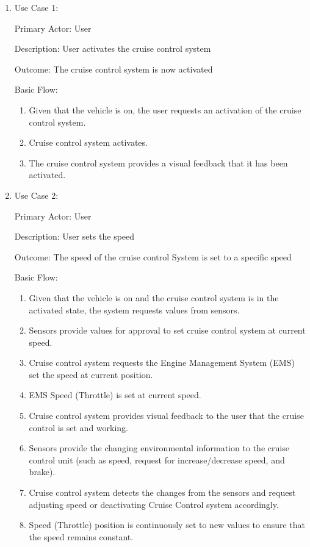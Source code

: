 \documentclass[preprint,11pt,3p]{article}
\begin{document}
\begin{enumerate}
	\item 	Use Case 1:\par
			Primary Actor: User\par
			Description: User activates the cruise control system\par
			Outcome: The cruise control system is now activated\par
			Basic Flow:
		\begin{enumerate}
			\item Given that the vehicle is on, the user requests an activation of the cruise control system.
			\item Cruise control system activates.
			\item The cruise control system provides a visual feedback that it has been activated.
		\end{enumerate}
	\item 	Use Case 2: \par
			Primary Actor: User \par
			Description: User sets the speed\par
			Outcome: The speed of the cruise control System is set to a specific speed\par
			Basic Flow:
		\begin{enumerate}
			\item Given that the vehicle is on and the cruise control system is in the activated state, the system requests values from sensors.
			\item Sensors provide values for approval to set cruise control system at current speed.
			\item Cruise control system requests the Engine Management System (EMS) set the speed at current position.
			\item EMS Speed (Throttle) is set at current speed.
			\item Cruise control system provides visual feedback to the user that the cruise control is set and working.
			\item Sensors provide the changing environmental information to the cruise control unit (such as speed, request for increase/decrease speed, and brake).
			\item Cruise control system detects the changes from the sensors and request adjusting speed or deactivating Cruise Control system accordingly.
			\item Speed (Throttle) position is continuously set to new values to ensure that the speed remains constant.

\end{enumerate}
\end{enumerate}
\end{document}
